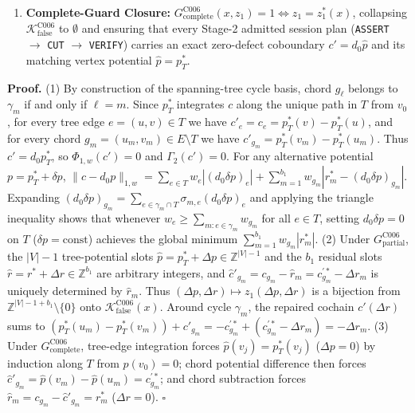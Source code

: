 \documentclass[
  11pt,
]{article}
\newcommand{\passthrough}[1]{#1}
\begin{document}
\begin{enumerate}
  \((d_1 c'(\Delta r))_{\gamma_m} = -\Delta r_m\)
  (\(\Gamma_2(c'(\Delta r)) = \|\Delta r\|_1 > 0\)), while any non-zero
  potential error \(\Delta p \ne 0\) with \(\Delta r = 0\) causes
  Stage-2 \passthrough{\lstinline!VERIFY!} to fail on the tree-edge
  coboundary check \(\hat{p}(v) - \hat{p}(u) = c'_{(u,\allowbreak v)}\).
\item
  \textbf{Complete-Guard Closure:}
  \(G_{\text{complete}}^{\text{C006}}(x,\allowbreak  z_1) = 1 \iff z_1 = z_1^*(x)\),
  collapsing \(\mathcal{K}_{\text{false}}^{\text{C006}}\) to
  \(\emptyset\) and ensuring that every Stage-2 admitted session plan
  (\passthrough{\lstinline!ASSERT!} \(\to\)
  \passthrough{\lstinline!CUT!} \(\to\)
  \passthrough{\lstinline!VERIFY!}) carries an exact zero-defect
  coboundary \(c' = d_0 \hat{p}\) and its matching vertex potential
  \(\hat{p} = p_T^*\).
\end{enumerate}

\textbf{Proof.} (1) By construction of the spanning-tree cycle basis,
chord \(g_\ell\) belongs to \(\gamma_m\) if and only if \(\ell = m\).
Since \(p_T^*\) integrates \(c\) along the unique path in \(T\) from
\(v_0\), for every tree edge \(e = (u,\allowbreak v) \in T\) we have
\(c'_e = c_e = p_T^*(v) - p_T^*(u)\), and for every chord
\(g_m = (u_m,\allowbreak  v_m) \in E \setminus T\) we have
\(c'_{g_m} = p_T^*(v_m) - p_T^*(u_m)\). Thus \(c' = d_0 p_T^*\), so
\(\Phi_{1,\allowbreak w}(c') = 0\) and \(\Gamma_2(c') = 0\). For any
alternative potential \(p = p_T^* + \delta p\),
\(\|c - d_0 p\|_{1,\allowbreak w} = \sum_{e \in T} w_e |(d_0 \delta p)_e| + \sum_{m=1}^{b_1} w_{g_m} |r_m^* - (d_0 \delta p)_{g_m}|\).
Expanding
\((d_0 \delta p)_{g_m} = \sum_{e \in \gamma_m \cap T} \sigma_{m,\allowbreak e} (d_0 \delta p)_e\)
and applying the triangle inequality shows that whenever
\(w_e \ge \sum_{m : e \in \gamma_m} w_{g_m}\) for all \(e \in T\),
setting \(d_0 \delta p = 0\) on \(T\) (\(\delta p = \text{const}\))
achieves the global minimum \(\sum_{m=1}^{b_1} w_{g_m} |r_m^*|\). (2)
Under \(G_{\text{partial}}^{\text{C006}}\), the \(|V|-1\) tree-potential
slots \(\hat{p} = p_T^* + \Delta p \in \mathbb{Z}^{|V|-1}\) and the
\(b_1\) residual slots \(\hat{r} = r^* + \Delta r \in \mathbb{Z}^{b_1}\)
are arbitrary integers, and
\(\hat{c}'_{g_m} = c_{g_m} - \hat{r}_m = c_{g_m}^{\prime *} - \Delta r_m\)
is uniquely determined by \(\hat{r}_m\). Thus
\((\Delta p,\allowbreak  \Delta r) \mapsto z_1(\Delta p,\allowbreak  \Delta r)\)
is a bijection from \(\mathbb{Z}^{|V|-1+b_1} \setminus \{0\}\) onto
\(\mathcal{K}_{\text{false}}^{\text{C006}}(x)\). Around cycle
\(\gamma_m\), the repaired cochain \(c'(\Delta r)\) sums to
\((p_T^*(u_m) - p_T^*(v_m)) + c'_{g_m} = -c_{g_m}^{\prime *} + (c_{g_m}^{\prime *} - \Delta r_m) = -\Delta r_m\).
(3) Under \(G_{\text{complete}}^{\text{C006}}\), tree-edge integration
forces \(\hat{p}(v_j) = p_T^*(v_j)\) (\(\Delta p = 0\)) by induction
along \(T\) from \(p(v_0) = 0\); chord potential difference then forces
\(\hat{c}'_{g_m} = \hat{p}(v_m) - \hat{p}(u_m) = c_{g_m}^{\prime *}\);
and chord subtraction forces
\(\hat{r}_m = c_{g_m} - \hat{c}'_{g_m} = r_m^*\) (\(\Delta r = 0\)).
\(\square\)
\end{document}
